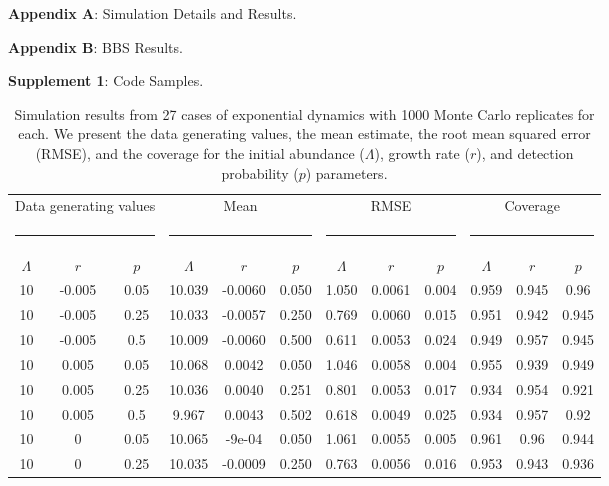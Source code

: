 \documentclass[12pt,english]{article}
\begin{document}
\begin{spacing}{1.9}
\begin{flushleft}


\begin{center}
\noindent{}\textbf{Appendix A}: Simulation Details and Results.

\noindent{}\textbf{Appendix B}: BBS Results.

\noindent{}\textbf{Supplement 1}: Code Samples.
\end{center}

\newpage


\clearpage

\begin{table}[htb]
  \centering
  \footnotesize
  \caption{Simulation results from 27 cases of exponential dynamics with 1000 Monte Carlo replicates for each.
We present the data generating values, the mean estimate, the root mean squared error (RMSE), and the coverage
for the initial abundance ($\Lambda$), growth rate ($r$), and detection probability ($p$) parameters.}
  \begin{tabular}{cccccccccccc}
    \hline
    \multicolumn{3}{c}{Data generating values}&
    \multicolumn{3}{c}{Mean} &
    \multicolumn{3}{c}{RMSE} &
    \multicolumn{3}{c}{Coverage} \\
    \multicolumn{3}{c}{\rule{3.5cm}{1pt}} &
    \multicolumn{3}{c}{\rule{3.75cm}{1pt}} &
    \multicolumn{3}{c}{\rule{3.75cm}{1pt}} &
    \multicolumn{3}{c}{\rule{3.7cm}{1pt}} \\
    $\Lambda$ & $r$ & $p$ & $\Lambda$ & $r$ & $p$ & $\Lambda$ & $r$ &
    $p$ & $\Lambda$ & $r$ & $p$ \\
    \hline
10	&-0.005	&0.05	&10.039	&-0.0060	&0.050	&1.050	&0.0061	&0.004	&0.959	&0.945	&0.96\\
10	&-0.005	&0.25	&10.033	&-0.0057	&0.250	&0.769	&0.0060	&0.015 &0.951	&0.942	&0.945\\
10	&-0.005	&0.5	&10.009	&-0.0060	&0.500	&0.611	&0.0053	&0.024	&0.949	&0.957	&0.945\\
10	&0.005	&0.05	&10.068	&0.0042		&0.050	&1.046	&0.0058	&0.004	&0.955	&0.939	&0.949\\
10	&0.005	&0.25	&10.036	&0.0040		&0.251	&0.801	&0.0053	&0.017	&0.934	&0.954	&0.921\\
10	&0.005	&0.5	&9.967	&0.0043		&0.502	&0.618	&0.0049	&0.025	&0.934	&0.957	&0.92\\
10	&0	&0.05	&10.065		&-9e-04	      &0.050	&1.061	&0.0055	&0.005	&0.961	&0.96	&0.944\\
10	&0	&0.25	&10.035		&-0.0009	&0.250	&0.763	&0.0056	&0.016	&0.953	&0.943	&0.936\\

\end{tabular}
\end{table}
\end{flushleft}
\end{spacing}
\end{document}
